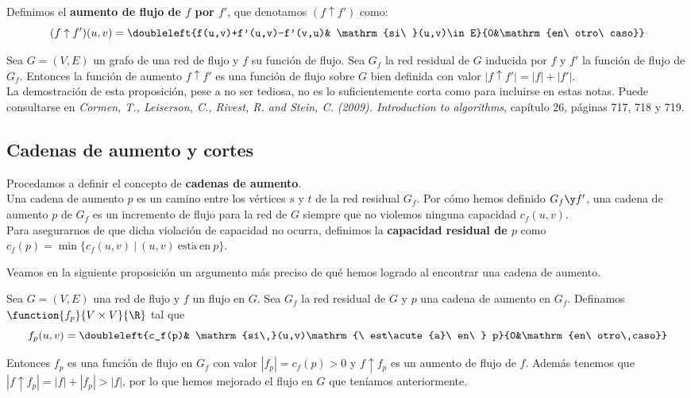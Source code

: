 \begin{defi} Definimos el \textbf{aumento de flujo de $f$ por $f'$}, que denotamos $(f\uparrow f')$ como:
\[(f\uparrow f')(u,v)=\doubleleft{f(u,v)+f'(u,v)-f'(v,u)& \mathrm{si\ }(u,v)\in E}{0&\mathrm{en\ otro\ caso}}\]
\end{defi}

\begin{proposicion} Sea $G=(V,E)$ un grafo de una red de flujo y $f$ su función de flujo. Sea $G_f$ la red residual de $G$ inducida por $f$ y $f'$ la función de flujo de $G_f$. Entonces la función de aumento $f\uparrow f'$ es una función de flujo sobre $G$ bien definida con valor $|f\uparrow f'|=|f|+|f'|$.\\

La demostración de esta proposición, pese a no ser tediosa, no es lo suficientemente corta como para incluirse en estas notas. Puede consultarse en \textit{Cormen, T., Leiserson, C., Rivest, R. and Stein, C. (2009). Introduction to algorithms}, capítulo 26, páginas 717, 718 y 719.
\end{proposicion}

\subsection{Cadenas de aumento y cortes}

\begin{defi} Procedamos a definir el concepto de \textbf{cadenas de aumento}.\\
Una cadena de aumento $p$ es un camino entre los vértices $s$ y $t$ de la red residual $G_f$. Por cómo hemos definido $G_f\y f'$, una cadena de aumento $p$ de $G_f$ es un incremento de flujo para la red de $G$ siempre que no violemos ninguna capacidad $c_f(u,v)$.\\

Para asegurarnos de que dicha violación de capacidad no ocurra, definimos la \textbf{capacidad residual de $p$} como $c_f(p)=\min\{c_f(u,v)\ |\ (u,v)\mathrm{\ est\acute{a}\ en\ } p\}$.
\end{defi}

Veamos en la siguiente proposición un argumento más preciso de qué hemos logrado al encontrar una cadena de aumento.

\begin{proposicion} Sea $G=(V,E)$ una red de flujo y $f$ un flujo en $G$. Sea $G_f$ la red residual de $G$ y $p$ una cadena de aumento en $G_f$. Definamos $\function{f_p}{V\times V}{\R}$ tal que \[f_p(u,v)=\doubleleft{c_f(p)& \mathrm{si\ }(u,v)\mathrm{\ est\acute{a}\ en\ } p}{0&\mathrm{en\ otro\ caso}}\]

Entonces $f_p$ es una función de flujo en $G_f$ con valor $|f_p|=c_f(p)>0$ y $f\uparrow f_p$ es un aumento de flujo de $f$. Además tenemos que $|f\uparrow f_p|=|f|+|f_p|>|f|$, por lo que hemos mejorado el flujo en $G$ que teníamos anteriormente.
\end{proposicion}

